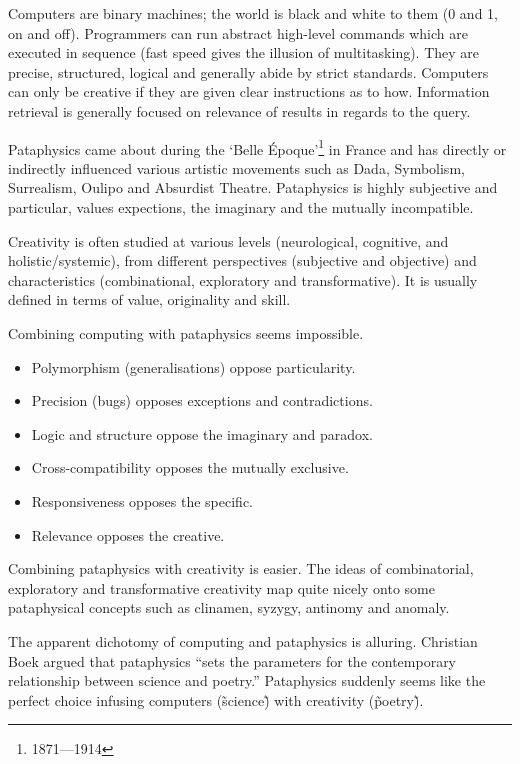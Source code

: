 Computers are binary machines; the world is black and white to them (0 and 1, on and off). Programmers can run abstract high-level commands which are executed in sequence (fast speed gives the illusion of multitasking). They are precise, structured, logical and generally abide by strict standards. Computers can only be creative if they are given clear instructions as to how. Information retrieval is generally focused on relevance of results in regards to the query.

Pataphysics came about during the `Belle Époque'\footnote{1871---1914} in France and has directly or indirectly influenced various artistic movements such as Dada, Symbolism, Surrealism, Oulipo and Absurdist Theatre. Pataphysics is highly subjective and particular, values expections, the imaginary and the mutually incompatible.

Creativity is often studied at various levels (neurological, cognitive, and holistic/systemic), from different perspectives (subjective and objective) and characteristics (combinational, exploratory and transformative). It is usually defined in terms of value, originality and skill.

Combining computing with pataphysics seems impossible.

\begin{itemize}
  \item Polymorphism (generalisations) oppose particularity.
  \item Precision (bugs) opposes exceptions and contradictions.
  \item Logic and structure oppose the imaginary and paradox.
  \item Cross-compatibility opposes the mutually exclusive.
  \item Responsiveness opposes the specific.
  \item Relevance opposes the creative.
\end{itemize}

Combining pataphysics with creativity is easier. The ideas of  combinatorial, exploratory and transformative creativity map quite nicely onto some pataphysical concepts such as clinamen, syzygy, antinomy and anomaly.

The apparent dichotomy of computing and pataphysics is alluring. Christian Boek argued that pataphysics ``sets the parameters for the contemporary relationship between science and poetry.'' \autocite{Boek2002} Pataphysics suddenly seems like the perfect choice infusing computers (\~science\~) with creativity (\~poetry\~).

